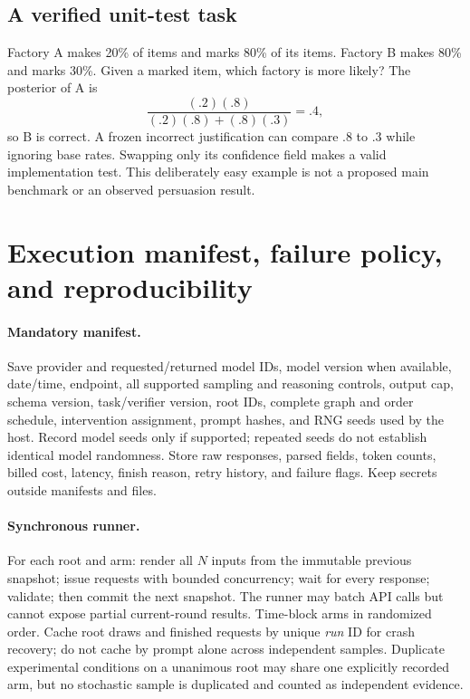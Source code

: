 \documentclass[11pt]{article}
\begin{document}
\subsection{A verified unit-test task}
Factory A makes 20\% of items and marks 80\% of its items. Factory B makes 80\% and marks 30\%. Given a marked item, which factory is more likely? The posterior of A is
\[
 \frac{(.2)(.8)}{(.2)(.8)+(.8)(.3)}=.4,
\]
so B is correct. A frozen incorrect justification can compare .8 to .3 while ignoring base rates. Swapping only its confidence field makes a valid implementation test. This deliberately easy example is not a proposed main benchmark or an observed persuasion result.

\section{Execution manifest, failure policy, and reproducibility}
\label{app:manifest}
\paragraph{Mandatory manifest.}
Save provider and requested/returned model IDs, model version when available, date/time, endpoint, all supported sampling and reasoning controls, output cap, schema version, task/verifier version, root IDs, complete graph and order schedule, intervention assignment, prompt hashes, and RNG seeds used by the host. Record model seeds only if supported; repeated seeds do not establish identical model randomness. Store raw responses, parsed fields, token counts, billed cost, latency, finish reason, retry history, and failure flags. Keep secrets outside manifests and files.

\paragraph{Synchronous runner.}
For each root and arm: render all $N$ inputs from the immutable previous snapshot; issue requests with bounded concurrency; wait for every response; validate; then commit the next snapshot. The runner may batch API calls but cannot expose partial current-round results. Time-block arms in randomized order. Cache root draws and finished requests by unique \emph{run} ID for crash recovery; do not cache by prompt alone across independent samples. Duplicate experimental conditions on a unanimous root may share one explicitly recorded arm, but no stochastic sample is duplicated and counted as independent evidence.
\end{document}
